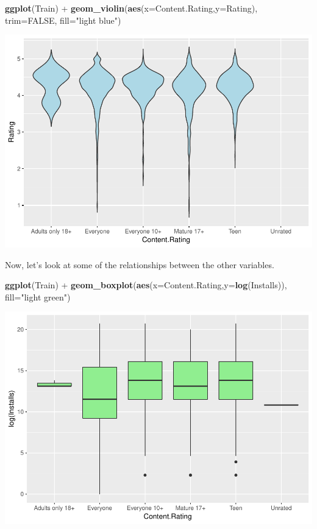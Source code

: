 \documentclass[]{article}
\newenvironment{Shaded}{\begin{snugshade}}{\end{snugshade}}
\newcommand{\KeywordTok}[1]{\textcolor[rgb]{0.13,0.29,0.53}{\textbf{{#1}}}}
\newcommand{\DataTypeTok}[1]{\textcolor[rgb]{0.13,0.29,0.53}{{#1}}}
\newcommand{\StringTok}[1]{\textcolor[rgb]{0.31,0.60,0.02}{{#1}}}
\newcommand{\OtherTok}[1]{\textcolor[rgb]{0.56,0.35,0.01}{{#1}}}
\newcommand{\NormalTok}[1]{{#1}}
\begin{document}
\begin{Shaded}
\begin{Highlighting}[]
\KeywordTok{ggplot}\NormalTok{(Train) +}\StringTok{ }\KeywordTok{geom_violin}\NormalTok{(}\KeywordTok{aes}\NormalTok{(}\DataTypeTok{x=}\NormalTok{Content.Rating,}\DataTypeTok{y=}\NormalTok{Rating), }\DataTypeTok{trim=}\OtherTok{FALSE}\NormalTok{, }\DataTypeTok{fill=}\StringTok{"light blue"}\NormalTok{)}
\end{Highlighting}
\end{Shaded}

\includegraphics{Project_2_Work_files/figure-latex/unnamed-chunk-16-5.pdf}

Now, let's look at some of the relationships between the other
variables.

\begin{Shaded}
\begin{Highlighting}[]
\KeywordTok{ggplot}\NormalTok{(Train) +}\StringTok{ }\KeywordTok{geom_boxplot}\NormalTok{(}\KeywordTok{aes}\NormalTok{(}\DataTypeTok{x=}\NormalTok{Content.Rating,}\DataTypeTok{y=}\KeywordTok{log}\NormalTok{(Installs)), }\DataTypeTok{fill=}\StringTok{"light green"}\NormalTok{)}
\end{Highlighting}
\end{Shaded}

\includegraphics{Project_2_Work_files/figure-latex/unnamed-chunk-17-1.pdf}
\end{document}
